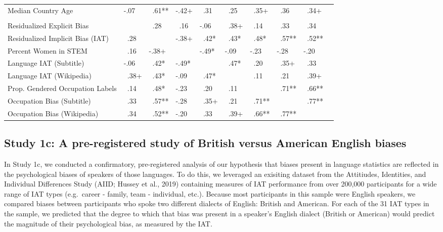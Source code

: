 \documentclass[man,floatsintext]{apa6}
\begin{document}
\begin{longtable}[t]{llllllllll}
\hspace{1em}Median Country Age & -.07 & \ .61** & -.42+ & \ .31 & \ .25 & \ .35+ & \ .36 & \ .34+ & \\
\addlinespace[0.3em]
\multicolumn{10}{l}{\textbf{Partial Correlations}}\\
\hspace{1em}Residualized Explicit Bias &  & \ .28 & \ .16 & -.06 & \ .38+ & \ .14 & \ .33 & \ .34 & \\
\hspace{1em}Residualized Implicit Bias (IAT) & \ .28 &  & -.38+ & \ .42* & \ .43* & \ .48* & \ .57** & \ .52** & \\
\hspace{1em}Percent Women in STEM & \ .16 & -.38+ &  & -.49* & -.09 & -.23 & -.28 & -.20 & \\
\hspace{1em}Language IAT (Subtitle) & -.06 & \ .42* & -.49* &  & \ .47* & \ .20 & \ .35+ & \ .33 & \\
\hspace{1em}Language IAT (Wikipedia) & \ .38+ & \ .43* & -.09 & \ .47* &  & \ .11 & \ .21 & \ .39+ & \\
\hspace{1em}Prop. Gendered Occupation Labels & \ .14 & \ .48* & -.23 & \ .20 & \ .11 &  & \ .71** & \ .66** & \\
\hspace{1em}Occupation Bias (Subtitle) & \ .33 & \ .57** & -.28 & \ .35+ & \ .21 & \ .71** &  & \ .77** & \\
\hspace{1em}Occupation Bias (Wikipedia) & \ .34 & \ .52** & -.20 & \ .33 & \ .39+ & \ .66** & \ .77** &  & \\
\bottomrule
\end{longtable}
\endgroup{}

\hypertarget{study-1c-a-pre-registered-study-of-british-versus-american-english-biases}{%
\subsection{Study 1c: A pre-registered study of British versus American English biases}\label{study-1c-a-pre-registered-study-of-british-versus-american-english-biases}}

In Study 1c, we conducted a confirmatory, pre-registered analysis of our hypothesis that biases present in language statistics are reflected in the psychological biases of speakers of those languages. To do this, we leveraged an exisiting dataset from the Attitiudes, Identities, and Individual Differences Study (AIID; Hussey et al., 2019) containing measures of IAT performance from over 200,000 participants for a wide range of IAT types (e.g.~career - family, team - individual, etc.). Because most participants in this sample were English speakers, we compared biases between participants who spoke two different dialects of English: British and American. For each of the 31 IAT types in the sample, we predicted that the degree to which that bias was present in a speaker's English dialect (British or American) would predict the magnitude of their psychological bias, as measured by the IAT.
\end{document}
